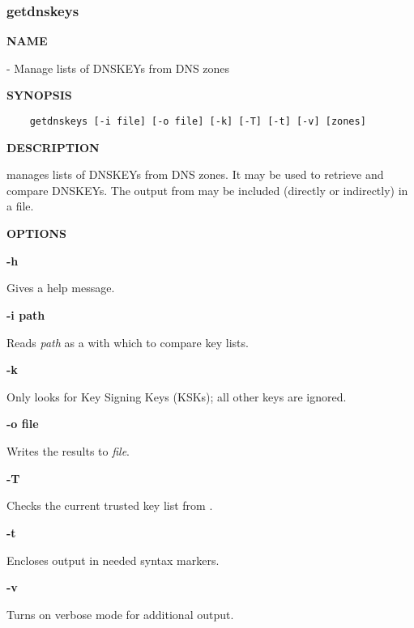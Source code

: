 \clearpage

\subsubsection{getdnskeys}

{\bf NAME}

 - Manage lists of DNSKEYs from DNS zones

{\bf SYNOPSIS}

\begin{verbatim}
    getdnskeys [-i file] [-o file] [-k] [-T] [-t] [-v] [zones]
\end{verbatim}

{\bf DESCRIPTION}

 manages lists of DNSKEYs from DNS zones.  It may be used
to retrieve and compare DNSKEYs.  The output from  may be
included (directly or indirectly) in a  file.

{\bf OPTIONS}

\begin{description}

\item {\bf -h}\verb" "

Gives a help message.

\item {\bf -i path}\verb" "

Reads {\it path} as a  with which to compare key lists.

\item {\bf -k}\verb" "

Only looks for Key Signing Keys (KSKs); all other keys are ignored.

\item {\bf -o file}\verb" "

Writes the results to {\it file}.

\item {\bf -T}\verb" "

Checks the current trusted key list from .

\item {\bf -t}\verb" "

Encloses output in needed  syntax markers.

\item {\bf -v}\verb" "

Turns on verbose mode for additional output.

\end{description}

